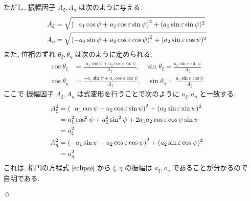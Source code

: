 \documentclass[uplatex,dvipdfmx,a4paper,11pt]{jlreq}
\makeatletter
\theoremstyle{definition}
\renewenvironment{proof}[1][\proofname]{\par
  \normalfont
  \topsep6\p@\@plus6\p@ \trivlist
  \item[\hskip\labelsep{\bfseries #1}\@addpunct{\bfseries}]\ignorespaces\quad\par
}{%
  \qed\endtrivlist\@endpefalse
}
\renewcommand\proofname{証明}
\makeatother
\begin{document}
\begin{proof}
  ただし, 振幅因子 $A_\xi, A_\eta$ は次のように与える.
  \begin{align}
    A_\xi  & = \sqrt{\qty(\ \ a_1\cos\psi + a_2\cos\varepsilon\sin\psi)^2 + (a_2\sin\varepsilon\sin\psi)^2} \\
    A_\eta & = \sqrt{\qty(-a_1\sin\psi + a_2\cos\varepsilon\cos\psi)^2 + (a_2\sin\varepsilon\cos\psi)^2}
  \end{align}
  また, 位相のずれ $\theta_\xi, \theta_\eta$ は次のように定められる.
  \begin{align}
    \cos\theta_\xi  & = \frac{\ \ a_1\cos\psi + a_2\cos\varepsilon\sin\psi}{A_\xi}, \quad \sin\theta_\xi = \frac{a_2\sin\varepsilon\sin\psi}{A_\xi}  \\
    \cos\theta_\eta & = \frac{-a_1\sin\psi + a_2\cos\varepsilon\cos\psi}{A_\xi},    \quad \sin\theta_\eta = \frac{a_2\sin\varepsilon\cos\psi}{A_\xi}
  \end{align}
  ここで 振幅因子 $A_\xi, A_\eta$ は式変形を行うことで次のように $a_\xi, a_\eta$ と一致する.
  \begin{align}
    A_\xi^2  & = \qty(\ \ a_1\cos\psi + a_2\cos\varepsilon\sin\psi)^2 + (a_2\sin\varepsilon\sin\psi)^2 \\
             & = a_1^2\cos^2\psi + a_2^2\sin^2\psi + 2a_1a_2\cos\varepsilon\cos\psi\sin\psi            \\
             & = a_\xi^2                                                                               \\
    A_\eta^2 & = \qty(-a_1\sin\psi + a_2\cos\varepsilon\cos\psi)^2 + (a_2\sin\varepsilon\cos\psi)^2    \\
             & = a_\eta^2
  \end{align}
  これは, 楕円の方程式 \eqref{eclipse} から $\xi, \eta$ の振幅は $a_\xi, a_\eta$ であることが分かるので自明である.


\end{proof}
\end{document}
